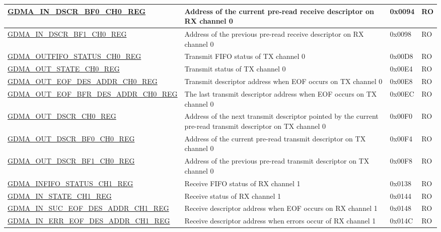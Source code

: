 \begin{longtable}{ | p{6.7cm} | p{6cm} | p{1.3cm} | p{1.5cm} | }
\hyperref[regdesc:GDMAINDSCRBF0CHNREG]{GDMA\_IN\_DSCR\_BF0\_CH0\_REG} & Address of the current pre-read receive descriptor on RX channel 0 & 0x0094 & RO \\ \hline
\hyperref[regdesc:GDMAINDSCRBF1CHNREG]{GDMA\_IN\_DSCR\_BF1\_CH0\_REG} & Address of the previous pre-read receive descriptor on RX channel 0 & 0x0098 & RO \\ \hline
\hyperref[regdesc:GDMAOUTFIFOSTATUSCHNREG]{GDMA\_OUTFIFO\_STATUS\_CH0\_REG} & Transmit FIFO status of TX channel 0 & 0x00D8 & RO \\ \hline
\hyperref[regdesc:GDMAOUTSTATECHNREG]{GDMA\_OUT\_STATE\_CH0\_REG} & Transmit status of TX channel 0 & 0x00E4 & RO \\ \hline
\hyperref[regdesc:GDMAOUTEOFDESADDRCHNREG]{GDMA\_OUT\_EOF\_DES\_ADDR\_CH0\_REG} & Transmit descriptor address when EOF occurs on TX channel 0 & 0x00E8 & RO \\ \hline
\hyperref[regdesc:GDMAOUTEOFBFRDESADDRCHNREG]{GDMA\_OUT\_EOF\_BFR\_DES\_ADDR\_CH0\newline\_REG} & The last transmit descriptor address when EOF occurs on TX channel 0 & 0x00EC & RO \\ \hline
\hyperref[regdesc:GDMAOUTDSCRCHNREG]{GDMA\_OUT\_DSCR\_CH0\_REG} & Address of the next transmit descriptor pointed by the current pre-read transmit descriptor on TX channel 0 & 0x00F0 & RO \\ \hline
\hyperref[regdesc:GDMAOUTDSCRBF0CHNREG]{GDMA\_OUT\_DSCR\_BF0\_CH0\_REG} & Address of the current pre-read transmit descriptor on TX channel 0 & 0x00F4 & RO \\ \hline
\hyperref[regdesc:GDMAOUTDSCRBF1CHNREG]{GDMA\_OUT\_DSCR\_BF1\_CH0\_REG} & Address of the previous pre-read transmit descriptor on TX channel 0 & 0x00F8 & RO \\ \hline
\hyperref[regdesc:GDMAINFIFOSTATUSCHNREG]{GDMA\_INFIFO\_STATUS\_CH1\_REG} & Receive FIFO status of RX channel 1 & 0x0138 & RO \\ \hline
\hyperref[regdesc:GDMAINSTATECHNREG]{GDMA\_IN\_STATE\_CH1\_REG} & Receive status of RX channel 1 & 0x0144 & RO \\ \hline
\hyperref[regdesc:GDMAINSUCEOFDESADDRCHNREG]{GDMA\_IN\_SUC\_EOF\_DES\_ADDR\_CH1\_REG} & Receive descriptor address when EOF occurs on RX channel 1 & 0x0148 & RO \\ \hline
\hyperref[regdesc:GDMAINERREOFDESADDRCHNREG]{GDMA\_IN\_ERR\_EOF\_DES\_ADDR\_CH1\_REG} & Receive descriptor address when errors occur of RX channel 1 & 0x014C & RO \\ \hline

\end{longtable}
